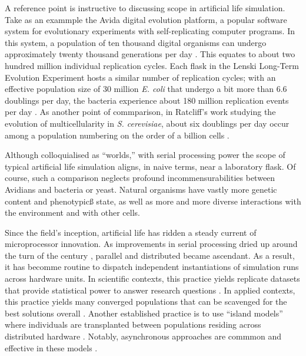A reference point is instructive to discussing scope in artificial life simulation.
Take as an exammple the Avida digital evolution platform, a popular software system for evolutionary experiments with self-replicating computer programs.
In this system, a population of ten thousand digital organisms can undergo approximately twenty thousand generations per day \citep{ofria2009artificial}.
This equates to about two hundred million individual replication cycles.
Each flask in the Lenski Long-Term Evolution Experiment hosts a similar number of replication cycles; with an effective population size of 30 million \textit{E. coli} that undergo a bit more than 6.6 doublings per day, the bacteria experience about 180 million replication events per day \citep{good2017dynamics}.
As another point of commparison, in Ratcliff’s work studying the evolution of multicellularity in \textit{S. cerevisiae}, about six doublings per day occur among a population numbering on the order of a billion cells \citep{ratcliff2012experimental}.

Although colloquialised as ``worlds,'' with serial processing power the scope of typical artificial life simulation aligns, in naive terms, near a laboratory flask.
Of course, such a comparison neglects profound incommensurabilities between Avidians and bacteria or yeast.
Natural organisms have vastly more genetic content and phenotypicß state, as well as more and more diverse interactions with the environment and with other cells.

Since the field's inception, artificial life has ridden a steady current of microprocessor innovation.
As improvements in serial processing dried up around the turn of the century \citep{sutter2005free}, parallel and distributed became ascendant.
As a result, it has becomme routine to dispatch independent instantiations of simulation runs across hardware units.
In scientific contexts, this practice yields replicate datasets that provide statistical power to answer research questions \citep{dolson2017spatial}.
In applied contexts, this practice yields many converged populations that can be scavenged for the best solutions overall \citep{hornby2006automated}.
Another established practice is to use ``island models'' where individuals are transplanted between populations residing across distributed hardware \citep{gorges1990explicit}.
Notably, asynchronous approaches are commmon and effective in these models \citep{abdelhafez2019performance}.

